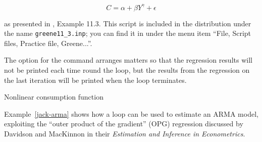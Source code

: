 \[ C = \alpha + \beta Y^{\gamma} + \epsilon \]

as presented in \cite{greene00}, Example 11.3.  This script is included
in the  distribution under the name \verb+greene11_3.inp+;
you can find it in  under the menu item ``File, Script files,
Practice file, Greene...''.

The option  for the  command arranges
matters so that the regression results will not be printed each time
round the loop, but the results from the regression on the last
iteration will be printed when the loop terminates.

\begin{script}[htbp]
  \caption{Nonlinear consumption function}
  \label{greene-ils-script}
\end{script}

Example~\ref{jack-arma} shows how a loop can be used to
estimate an ARMA model, exploiting the ``outer product of the
gradient'' (OPG) regression discussed by Davidson and MacKinnon in
their \emph{Estimation and Inference in Econometrics}.

